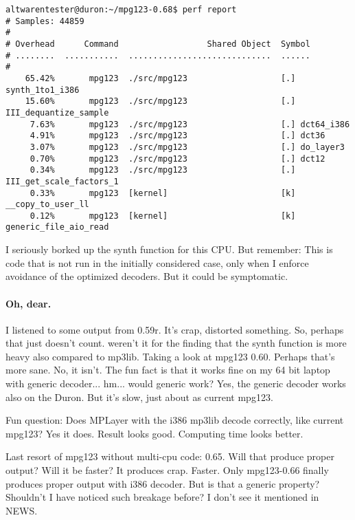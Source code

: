 \documentclass[a4paper,12pt]{scrartcl}
\begin{document}
\begin{verbatim}
altwarentester@duron:~/mpg123-0.68$ perf report
# Samples: 44859
#
# Overhead      Command                  Shared Object  Symbol
# ........  ...........  .............................  ......
#
    65.42%       mpg123  ./src/mpg123                   [.] synth_1to1_i386
    15.60%       mpg123  ./src/mpg123                   [.] III_dequantize_sample
     7.63%       mpg123  ./src/mpg123                   [.] dct64_i386
     4.91%       mpg123  ./src/mpg123                   [.] dct36
     3.07%       mpg123  ./src/mpg123                   [.] do_layer3
     0.70%       mpg123  ./src/mpg123                   [.] dct12
     0.34%       mpg123  ./src/mpg123                   [.] III_get_scale_factors_1
     0.33%       mpg123  [kernel]                       [k] __copy_to_user_ll
     0.12%       mpg123  [kernel]                       [k] generic_file_aio_read
\end{verbatim}

I seriously borked up the synth function for this CPU. But remember: This is code that is not run in the initially considered case, only when I enforce avoidance of the optimized decoders.
But it could be symptomatic.

\paragraph{Oh, dear.} I listened to some output from 0.59r. It's crap, distorted something.
So, perhaps that just doesn't count. weren't it for the finding that the synth function is more heavy also compared to mp3lib.
Taking a look at mpg123 0.60. Perhaps that's more sane.
No, it isn't. The fun fact is that it works fine on my 64 bit laptop with generic decoder... hm... would generic work?
Yes, the generic decoder works also on the Duron. But it's slow, just about as current mpg123.

Fun question: Does MPLayer with the i386 mp3lib decode correctly, like current mpg123? Yes it does.
Result looks good. Computing time looks better.

Last resort of mpg123 without multi-cpu code: 0.65. Will that produce proper output? Will it be faster? It produces crap. Faster. Only mpg123-0.66 finally produces proper output with i386 decoder. But is that a generic property?
Shouldn't I have noticed such breakage before? I don't see it mentioned in NEWS.
\end{document}
